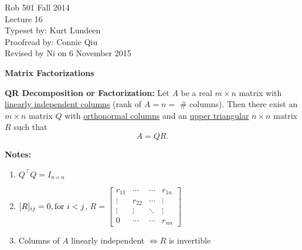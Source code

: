 \documentclass[letterpaper]{article}
\begin{document}
\baselineskip=48pt  %


\setlength{\parskip}{.3in}
\setlength{\itemsep}{.3in}

\pagestyle{plain}

{\Large \bf
\begin{center}
Rob 501 Fall 2014\\
Lecture 16\\
Typeset by:  Kurt Lundeen\\
Proofread by:  Connie Qiu\\
Revised by Ni on 6 November 2015
\end{center}
}

\Large

\begin{center}\textbf{Matrix Factorizations}\end{center}

\textbf{QR Decomposition or Factorization:}
Let $A$ be a real $m\times n$ matrix with \underline{linearly independent columns} (rank of $A = n=$ \# columns). Then there exist an $m\times n$ matrix $Q$ with \underline{orthonormal columns} and an \underline{upper triangular} $n\times n$ matrix $R$ such that
    \begin{equation*}
        A=QR.
    \end{equation*}

\textbf{Notes:}
    \begin{enumerate}[1)]
	    \item $Q^\top Q=I_{n\times n}$
	    \item $[R]_{ij}=0, \textnormal{for }i<j$,
	        $R=\left[\begin{array}{cccc} r_{11} & \cdots & \cdots & r_{1n}\\ \vdots & r_{22} & \cdots & \vdots\\ \vdots & \vdots & \ddots & \vdots\\ 0 & \cdots & \cdots & r_{nn} \end{array}\right]$
	    \item Columns of $A$ linearly independent $\Leftrightarrow R$ is invertible
    \end{enumerate}
\end{document}
